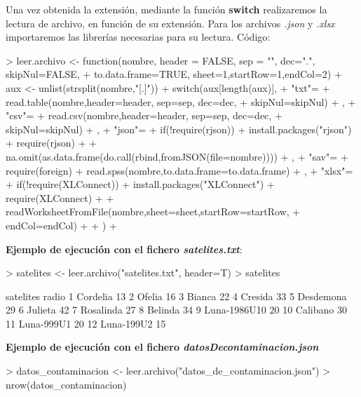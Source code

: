 \documentclass [a4paper] {article}
\begin{document}
Una vez obtenida la extensión, mediante la función \textbf{switch} realizaremos la lectura de archivo, en función de su extensión. 
Para los archivos \textit{.json} y \textit{.xlsx} importaremos las librerías necesarias para su lectura.
\newpage
Código:
\begin{Schunk}
\begin{Sinput}
> leer.archivo <- function(nombre, header = FALSE, sep = "", dec=".", skipNul=FALSE, 
+ 				to.data.frame=TRUE, sheet=1,startRow=1,endCol=2){
+ 	aux <- unlist(strsplit(nombre,"[.]"))
+ 	switch(aux[length(aux)],
+ 		"txt"={
+ 			read.table(nombre,header=header, sep=sep, dec=dec, 
+ 			skipNul=skipNul)
+ 		},
+ 		"csv"={
+ 			read.csv(nombre,header=header, sep=sep, dec=dec, 
+ 			skipNul=skipNul)
+ 		},
+ 		"json"={
+ 			if(!require(rjson)){
+ 				install.packages("rjson")
+ 				require(rjson)
+ 			}
+ 			na.omit(as.data.frame(do.call(rbind,fromJSON(file=nombre))))
+ 		},
+ 		"sav"={
+ 			require(foreign)
+ 			read.spss(nombre,to.data.frame=to.data.frame)
+ 		},
+ 		"xlsx"={
+ 			if(!require(XLConnect)){
+ 				install.packages("XLConnect")
+ 				require(XLConnect)
+ 			}
+ 			readWorksheetFromFile(nombre,sheet=sheet,startRow=startRow,
+ 			endCol=endCol)
+ 		}
+ 	)
+ }
\end{Sinput}
\end{Schunk}
\newpage
\hfil \textbf{Ejemplo de ejecución con el fichero \textit{satelites.txt}}: \par
\begin{Schunk}
\begin{Sinput}
> satelites <- leer.archivo("satelites.txt", header=T)
> satelites
\end{Sinput}
\begin{Soutput}
      satelites radio
1      Cordelia    13
2        Ofelia    16
3        Bianca    22
4       Cresida    33
5     Desdemona    29
6       Julieta    42
7     Rosalinda    27
8       Belinda    34
9  Luna-1986U10    20
10     Calibano    30
11   Luna-999U1    20
12   Luna-199U2    15
\end{Soutput}
\end{Schunk}

\hfil \textbf{Ejemplo de ejecución con el fichero \textit{datosDecontaminacion.json}} \par
\begin{Schunk}
\begin{Sinput}
> datos_contaminacion <- leer.archivo("datos_de_contaminacion.json")
> nrow(datos_contaminacion)
\end{Sinput}
\end{Schunk}
\end{document}
